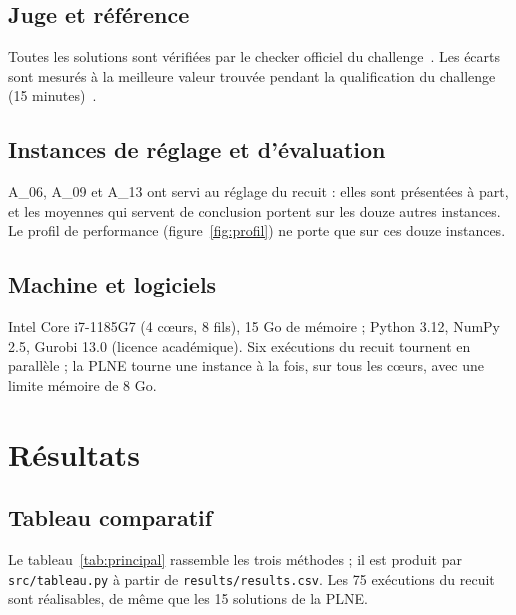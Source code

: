 \documentclass[11pt,a4paper]{report}
\begin{document}
\section{Juge et référence}

Toutes les solutions sont vérifiées par le checker officiel du challenge~\cite{depot}. Les écarts
sont mesurés à la meilleure valeur trouvée pendant la qualification du challenge
(15 minutes)~\cite{qualif}.

\section{Instances de réglage et d'évaluation}

A\_06, A\_09 et A\_13 ont servi au réglage du recuit : elles sont présentées à part, et les moyennes
qui servent de conclusion portent sur les douze autres instances. Le profil de performance
(figure~\ref{fig:profil}) ne porte que sur ces douze instances.

\section{Machine et logiciels}

Intel Core i7-1185G7 (4 cœurs, 8 fils), 15 Go de mémoire ; Python 3.12, NumPy 2.5, Gurobi 13.0
(licence académique). Six exécutions du recuit tournent en parallèle ; la PLNE tourne une instance à
la fois, sur tous les cœurs, avec une limite mémoire de 8 Go.

\chapter{Résultats}\label{chap:resultats}

\section{Tableau comparatif}

Le tableau~\ref{tab:principal} rassemble les trois méthodes ; il est produit par
\texttt{src/tableau.py} à partir de \texttt{results/results.csv}. Les 75 exécutions du recuit sont
réalisables, de même que les 15 solutions de la PLNE.

\begin{table}[H]
\centering
\caption{Comparaison au temps du challenge. Entre parenthèses : écart à la référence ; en gras :
référence atteinte (écart inférieur à 0,001\,\%). Gap certifié : (PLNE $-$ borne) / PLNE.
$^\dagger$ : borne obtenue avec les coupes de quantile. Les moyennes portent sur les écarts.}
\label{tab:principal}
\scriptsize
\setlength{\tabcolsep}{4pt}

\end{table}
\end{document}

